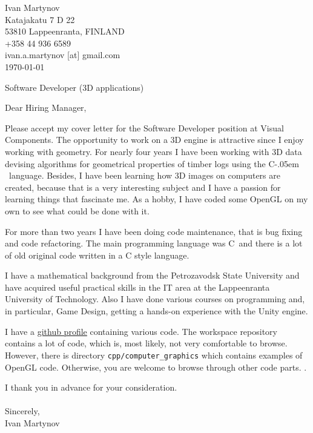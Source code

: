 \documentclass[]{article}
\newcommand{\Csharp}{%
  {\settoheight{\dimen0}{C}C\kern-.05em \resizebox{!}{\dimen0}{\raisebox{\depth}{\#}}}}
\def\CC{{C\nolinebreak[4]\hspace{-.05em}\raisebox{.4ex}{\tiny\bf ++}}}
\begin{document}
\begin{flushright}
	Ivan Martynov\\
    Katajakatu 7 D 22\\
	53810 Lappeenranta, FINLAND\\
	+358 44 936 6589\\
	ivan.a.martynov [at] gmail.com\\
	\today
\end{flushright}


\begin{center}
  Software Developer (3D applications)
\end{center}

\noindent
Dear Hiring Manager,
\bigskip

\noindent
Please accept my cover letter for the Software Developer position at Visual
Components. The opportunity to work on a 3D engine is attractive since I enjoy
working with geometry. For nearly four years I have been working with 3D data devising algorithms
for geometrical properties of timber logs using the \Csharp\ language. Besides, I have
been learning how 3D
images on computers are created, because that is a very interesting subject and
I have a passion for learning things that fascinate me. As a hobby, I have
coded some OpenGL on my own to see what could be done with it.
\medskip

\noindent
For more than two years I have been doing code maintenance, that is bug fixing
and code refactoring. The main programming language was \CC\ and there is a lot
of old original code written in a C style language.
\medskip

\noindent
I have a mathematical background from the Petrozavodsk State University and have
acquired useful practical skills in the IT area at the Lappeenranta University of
Technology. Also I have done various courses on programming and, in particular,
Game Design, getting a hands-on experience with the Unity engine.
\medskip

\noindent
I have a \underline{\href{https://github.com/Ivan-Martynov}{github profile}} containing various code. The workspace repository
contains a lot of code, which is, most likely, not very comfortable to browse. However, there
is directory \verb|cpp/computer_graphics| which contains examples of OpenGL code.
Otherwise, you are welcome to browse through other code parts.
.\\ \medskip

\noindent
I thank you in advance for your consideration.\\\ \\

\noindent Sincerely,\\
Ivan Martynov
\end{document}
